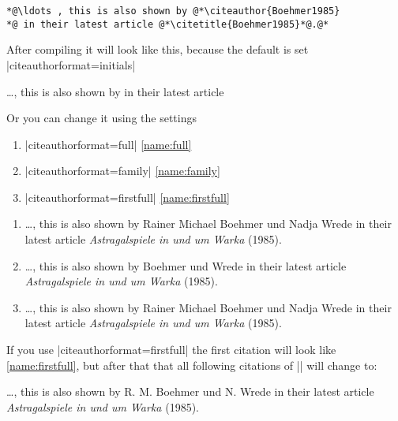 \documentclass[a4paper,
10pt,
greek,
french,
spanish,
italian,
ngerman,
english
]{ltxdoc}
\begin{document}
\begin{refsection}
\begin{lstlisting}
*@\ldots , this is also shown by @*\citeauthor{Boehmer1985} 
*@ in their latest article @*\citetitle{Boehmer1985}*@.@* \end{lstlisting}

After compiling it will look like this, 
because the default is set  |citeauthorformat=initials| 

\begin{bsp}
\ldots , this is also shown by \citeauthor{Boehmer1985} 
in their latest article 
\end{bsp}

Or you can change it using the settings
\begin{enumerate}
\item |citeauthorformat=full| \ref{name:full} 
\item |citeauthorformat=family| \ref{name:family}
\item  |citeauthorformat=firstfull|  \ref{name:firstfull}
\end{enumerate}



\begin{bsp}
\begin{enumerate}
\item\label{name:full} 
\ldots , this is also shown by {\color{red}Rainer Michael Boehmer  und Nadja Wrede} in their latest article \emph{Astragalspiele in und um Warka} (1985).
\item\label{name:family}
\ldots , this is also shown by {\color{red}Boehmer und  Wrede} in their latest article \emph{Astragalspiele in und um Warka} (1985).
\item\label{name:firstfull}
\ldots , this is also shown by {\color{red}Rainer Michael Boehmer  und Nadja Wrede} in their latest article \emph{Astragalspiele in und um Warka} (1985).
\end{enumerate}
\end{bsp}

If you use |citeauthorformat=firstfull| the first citation will look like \ref{name:firstfull}, but after that that all following citations of |\citeauthor{Boehmer1985}| will change to:

\begin{bsp}
\ldots , this is also shown by R. M. Boehmer und  N. Wrede in their latest article \emph{Astragalspiele in und um Warka} (1985).
\end{bsp}

\end{refsection}
\end{document}
